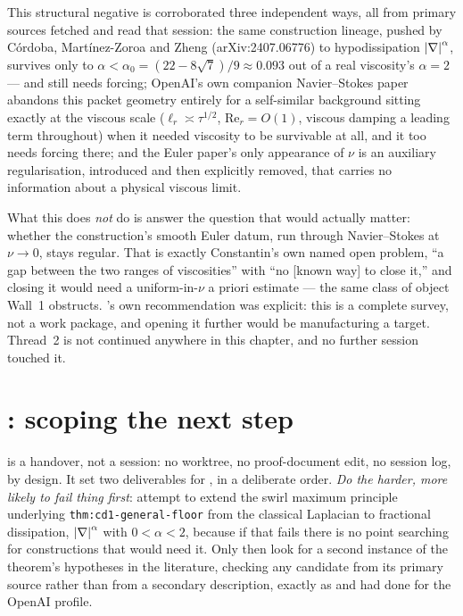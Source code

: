 This structural negative is corroborated three independent ways, all from
primary sources fetched and read that session: the same construction lineage,
pushed by C\'ordoba, Mart\'inez-Zoroa and Zheng (arXiv:2407.06776) to
hypodissipation \(\left|\nabla\right|^\alpha\), survives only to
\(\alpha<\alpha_0=(22-8\sqrt7)/9\approx0.093\) out of a real viscosity's
\(\alpha=2\) --- and still needs forcing; OpenAI's own companion
Navier--Stokes paper abandons this packet geometry entirely for a
self-similar background sitting exactly at the viscous scale
(\(\ell_r\asymp\tau^{1/2}\), \(\mathrm{Re}_r=O(1)\), viscous damping a leading
term throughout) when it needed viscosity to be survivable at all, and it too
needs forcing there; and the Euler paper's only appearance of \(\nu\) is an
auxiliary regularisation, introduced and then explicitly removed, that carries
no information about a physical viscous limit.

What this does \emph{not} do is answer the question that would actually
matter: whether the construction's smooth Euler datum, run through
Navier--Stokes at \(\nu\to0\), stays regular. That is exactly Constantin's own
named open problem, ``a gap between the two ranges of viscosities'' with ``no
[known way] to close it,'' and closing it would need a uniform-in-\(\nu\) a
priori estimate --- the same class of object Wall~1 obstructs. 's own
recommendation was explicit: this is a complete survey, not a work package,
and opening it further would be manufacturing a target. Thread~2 is not
continued anywhere in this chapter, and no further session touched it.

\section{\texorpdfstring{: scoping the next step}{S61: scoping the next step}}
\label{sec:ff-s61}

 is a handover, not a session: no worktree, no proof-document edit, no
session log, by design. It set two deliverables for , in a deliberate
order. \emph{Do the harder, more likely to fail thing first}: attempt to
extend the swirl maximum principle underlying \texttt{thm:cd1-general-floor}
from the classical Laplacian to fractional dissipation, \(\left|\nabla\right|^\alpha\)
with \(0<\alpha<2\), because if that fails there is no point searching for
constructions that would need it. Only then look for a second instance of the
theorem's hypotheses in the literature, checking any candidate from its
primary source rather than from a secondary description, exactly as 
and  had done for the OpenAI profile.

